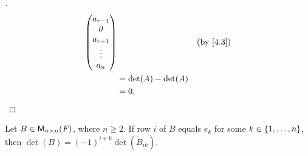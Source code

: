 \begin{proof}[]
\begin{align*}
\begin{pmatrix}
                                          a_{r - 1} \\
                                          \zv       \\
                                          a_{r + 1} \\
                                          \vdots    \\
                                          a_n
                                        \end{pmatrix} &  & \by{4.3} \\
            & = \det(A) - \det(A)                                   \\
            & = 0.
  \end{align*}
\end{proof}

\begin{lem}\label{4.2.5}
  Let \(B \in \ms[n][n][\F]\), where \(n \geq 2\).
  If row \(i\) of \(B\) equals \(e_k\) for some \(k \in \left\lbrace1, \dots, n\right\rbrace\), then \(\det(B) = (-1)^{i + k} \det(\tilde{B}_{i k})\).
\end{lem}

